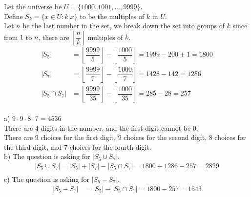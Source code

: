 \documentclass[12pt]{exam}
\begin{document}
\begin{solution}
	Let the universe be $U = \{1000,1001,...,9999\}$.\\
	Define $S_k = \{x \in U : k | x\}$ to be the multiples of $k$ in $U$.\\
	Let $n$ be the last number in the set, we break down the set into groups of $k$ since from $1$ to $n$, there are $\left\lfloor \dfrac{n}{k} \right\rfloor$ multiples of $k$.\\
	\begin{align}
		|S_5|          & = \left\lfloor \dfrac{9999}{5} \right\rfloor - \left\lfloor \dfrac{1000}{5} \right\rfloor = 1999 - 200 + 1= 1800 \\
		|S_7|          & = \left\lfloor \dfrac{9999}{7} \right\rfloor - \left\lfloor \dfrac{1000}{7} \right\rfloor = 1428 - 142 = 1286    \\
		|S_5 \cap S_7| & = \left\lfloor \dfrac{9999}{35} \right\rfloor - \left\lfloor \dfrac{1000}{35} \right\rfloor = 285 - 28 = 257     \\
	\end{align}

	a) $9\cdot 9\cdot 8\cdot 7 = 4536$\\
	There are 4 digits in the number, and the first digit cannot be 0.\\
	There are $9$ choices for the first digit, $9$ choices for the second digit, $8$ choices for the third digit, and $7$ choices for the fourth digit.\\
	b) The question is asking for $|S_5 \cup S_7|$.\\
	\begin{align}
		|S_5 \cup S_7| = |S_5| + |S_7| - |S_5 \cap S_7| = 1800 + 1286 - 257 = 2829 \\
	\end{align}
	c) The question is asking for $|S_5 - S_7|$.
	\begin{align}
		|S_5 - S_7| & = |S_5| - |S_5 \cap S_7| = 1800 - 257 = 1543 \\
	\end{align}
\end{solution}
\end{document}
